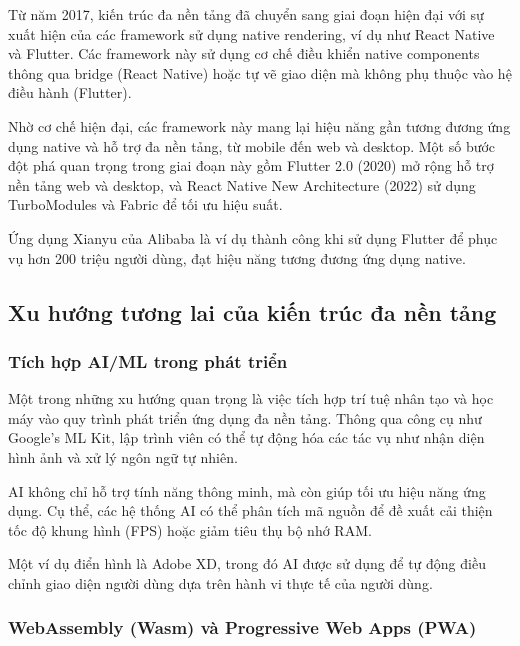 \hspace*{1.3em} Từ năm 2017, kiến trúc đa nền tảng đã chuyển sang giai đoạn hiện đại với sự xuất hiện của các framework sử dụng native rendering, ví dụ như React Native và Flutter. Các framework này sử dụng cơ chế điều khiển native components thông qua bridge (React Native) hoặc tự vẽ giao diện mà không phụ thuộc vào hệ điều hành (Flutter).

\indent Nhờ cơ chế hiện đại, các framework này mang lại hiệu năng gần tương đương ứng dụng native và hỗ trợ đa nền tảng, từ mobile đến web và desktop. Một số bước đột phá quan trọng trong giai đoạn này gồm Flutter 2.0 (2020) mở rộng hỗ trợ nền tảng web và desktop, và React Native New Architecture (2022) sử dụng TurboModules và Fabric để tối ưu hiệu suất.

\indent Ứng dụng Xianyu của Alibaba là ví dụ thành công khi sử dụng Flutter để phục vụ hơn 200 triệu người dùng, đạt hiệu năng tương đương ứng dụng native.
\subsection{Xu hướng tương lai của kiến trúc đa nền tảng}
\renewcommand{\labelitemi}{--}

\subsubsection{Tích hợp AI/ML trong phát triển}

\hspace*{1.5em}Một trong những xu hướng quan trọng là việc tích hợp trí tuệ nhân tạo và học máy vào quy trình phát triển ứng dụng đa nền tảng.  
Thông qua công cụ như Google’s ML Kit, lập trình viên có thể tự động hóa các tác vụ như nhận diện hình ảnh và xử lý ngôn ngữ tự nhiên.

AI không chỉ hỗ trợ tính năng thông minh, mà còn giúp tối ưu hiệu năng ứng dụng.  
Cụ thể, các hệ thống AI có thể phân tích mã nguồn để đề xuất cải thiện tốc độ khung hình (FPS) hoặc giảm tiêu thụ bộ nhớ RAM.

Một ví dụ điển hình là Adobe XD, trong đó AI được sử dụng để tự động điều chỉnh giao diện người dùng dựa trên hành vi thực tế của người dùng.

\vspace{0.5cm}

\subsubsection{WebAssembly (Wasm) và Progressive Web Apps (PWA)}

